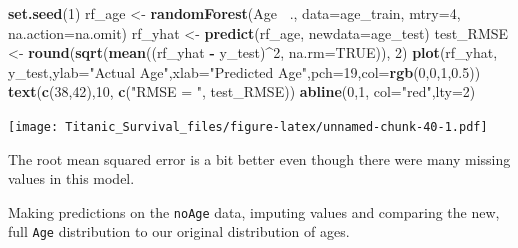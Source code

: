 \documentclass[]{article}
\newenvironment{Shaded}{\begin{snugshade}}{\end{snugshade}}
\newcommand{\KeywordTok}[1]{\textcolor[rgb]{0.13,0.29,0.53}{\textbf{#1}}}
\newcommand{\DataTypeTok}[1]{\textcolor[rgb]{0.13,0.29,0.53}{#1}}
\newcommand{\DecValTok}[1]{\textcolor[rgb]{0.00,0.00,0.81}{#1}}
\newcommand{\FloatTok}[1]{\textcolor[rgb]{0.00,0.00,0.81}{#1}}
\newcommand{\StringTok}[1]{\textcolor[rgb]{0.31,0.60,0.02}{#1}}
\newcommand{\OtherTok}[1]{\textcolor[rgb]{0.56,0.35,0.01}{#1}}
\newcommand{\OperatorTok}[1]{\textcolor[rgb]{0.81,0.36,0.00}{\textbf{#1}}}
\newcommand{\NormalTok}[1]{#1}
\begin{document}
\begin{Shaded}
\begin{Highlighting}[]
\KeywordTok{set.seed}\NormalTok{(}\DecValTok{1}\NormalTok{)}
\NormalTok{rf_age <-}\StringTok{ }\KeywordTok{randomForest}\NormalTok{(Age }\OperatorTok{~}\NormalTok{., }\DataTypeTok{data=}\NormalTok{age_train, }\DataTypeTok{mtry=}\DecValTok{4}\NormalTok{, }\DataTypeTok{na.action=}\NormalTok{na.omit)}
\NormalTok{rf_yhat <-}\StringTok{ }\KeywordTok{predict}\NormalTok{(rf_age, }\DataTypeTok{newdata=}\NormalTok{age_test)}
\NormalTok{test_RMSE <-}\StringTok{ }\KeywordTok{round}\NormalTok{(}\KeywordTok{sqrt}\NormalTok{(}\KeywordTok{mean}\NormalTok{((rf_yhat }\OperatorTok{-}\StringTok{ }\NormalTok{y_test)}\OperatorTok{^}\DecValTok{2}\NormalTok{, }\DataTypeTok{na.rm=}\OtherTok{TRUE}\NormalTok{)), }\DecValTok{2}\NormalTok{)}
\KeywordTok{plot}\NormalTok{(rf_yhat, y_test,}\DataTypeTok{ylab=}\StringTok{"Actual Age"}\NormalTok{,}\DataTypeTok{xlab=}\StringTok{"Predicted Age"}\NormalTok{,}\DataTypeTok{pch=}\DecValTok{19}\NormalTok{,}\DataTypeTok{col=}\KeywordTok{rgb}\NormalTok{(}\DecValTok{0}\NormalTok{,}\DecValTok{0}\NormalTok{,}\DecValTok{1}\NormalTok{,}\FloatTok{0.5}\NormalTok{))}
\KeywordTok{text}\NormalTok{(}\KeywordTok{c}\NormalTok{(}\DecValTok{38}\NormalTok{,}\DecValTok{42}\NormalTok{),}\DecValTok{10}\NormalTok{, }\KeywordTok{c}\NormalTok{(}\StringTok{"RMSE = "}\NormalTok{, test_RMSE))}
\KeywordTok{abline}\NormalTok{(}\DecValTok{0}\NormalTok{,}\DecValTok{1}\NormalTok{, }\DataTypeTok{col=}\StringTok{"red"}\NormalTok{,}\DataTypeTok{lty=}\DecValTok{2}\NormalTok{)}
\end{Highlighting}
\end{Shaded}

\texttt{[image: Titanic\_Survival\_files/figure-latex/unnamed-chunk-40-1.pdf]}

The root mean squared error is a bit better even though there were many
missing values in this model.

Making predictions on the \texttt{noAge} data, imputing values and
comparing the new, full \texttt{Age} distribution to our original
distribution of ages.

\begin{Shaded}
\end{Shaded}
\end{document}
